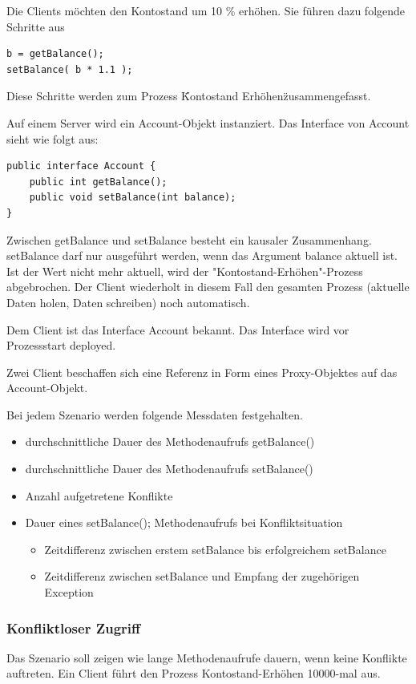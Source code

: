 \documentclass{article}
\begin{document}
Die Clients möchten den Kontostand um 10 \% erhöhen. Sie führen dazu folgende Schritte aus
\begin{lstlisting}
b = getBalance();
setBalance( b * 1.1 );
\end{lstlisting}
Diese Schritte werden zum Prozess \"Kontostand Erhöhen\" zusammengefasst.

Auf einem Server wird ein Account-Objekt instanziert.
Das Interface von Account sieht wie folgt aus:
\begin{lstlisting}
public interface Account {
    public int getBalance();
    public void setBalance(int balance);    
}
\end{lstlisting}
Zwischen getBalance und setBalance besteht ein kausaler Zusammenhang. setBalance darf nur ausgeführt werden, wenn das Argument balance aktuell ist. Ist der Wert nicht mehr aktuell, wird der "Kontostand-Erhöhen"-Prozess abgebrochen. Der Client wiederholt in diesem Fall den gesamten Prozess (aktuelle Daten holen, Daten schreiben) noch automatisch.

Dem Client ist das Interface Account bekannt. Das Interface wird vor Prozessstart deployed.

Zwei Client beschaffen sich eine Referenz in Form eines Proxy-Objektes auf das Account-Objekt. 

Bei jedem Szenario werden folgende Messdaten festgehalten.
\begin{itemize}
\item durchschnittliche Dauer des Methodenaufrufs getBalance()
\item durchschnittliche Dauer des Methodenaufrufs setBalance()
\item Anzahl aufgetretene Konflikte
\item Dauer eines setBalance(); Methodenaufrufs bei Konfliktsituation
  \begin{itemize}
  \item Zeitdifferenz zwischen erstem setBalance bis erfolgreichem setBalance
  \item Zeitdifferenz zwischen setBalance und Empfang der zugehörigen Exception
  \end{itemize}
\end{itemize}

\subsubsection{Konfliktloser Zugriff}
\label{sec:konfl-zugr}

Das Szenario soll zeigen wie lange Methodenaufrufe dauern, wenn keine Konflikte auftreten. Ein Client führt den Prozess Kontostand-Erhöhen 10000-mal aus.
\end{document}

